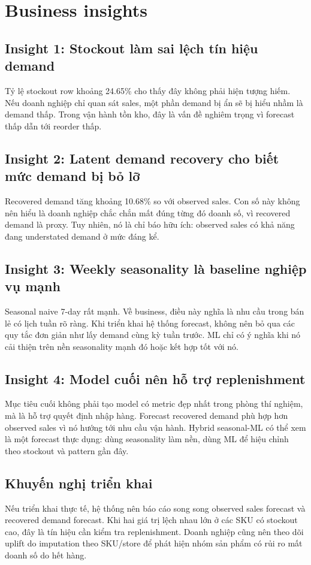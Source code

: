 \section{Business insights}

\subsection{Insight 1: Stockout làm sai lệch tín hiệu demand}

Tỷ lệ stockout row khoảng 24.65\% cho thấy đây không phải hiện tượng hiếm. Nếu doanh nghiệp chỉ quan sát sales, một phần demand bị ẩn sẽ bị hiểu nhầm là demand thấp. Trong vận hành tồn kho, đây là vấn đề nghiêm trọng vì forecast thấp dẫn tới reorder thấp.

\subsection{Insight 2: Latent demand recovery cho biết mức demand bị bỏ lỡ}

Recovered demand tăng khoảng 10.68\% so với observed sales. Con số này không nên hiểu là doanh nghiệp chắc chắn mất đúng từng đó doanh số, vì recovered demand là proxy. Tuy nhiên, nó là chỉ báo hữu ích: observed sales có khả năng đang understated demand ở mức đáng kể.

\subsection{Insight 3: Weekly seasonality là baseline nghiệp vụ mạnh}

Seasonal naive 7-day rất mạnh. Về business, điều này nghĩa là nhu cầu trong bán lẻ có lịch tuần rõ ràng. Khi triển khai hệ thống forecast, không nên bỏ qua các quy tắc đơn giản như lấy demand cùng kỳ tuần trước. ML chỉ có ý nghĩa khi nó cải thiện trên nền seasonality mạnh đó hoặc kết hợp tốt với nó.

\subsection{Insight 4: Model cuối nên hỗ trợ replenishment}

Mục tiêu cuối không phải tạo model có metric đẹp nhất trong phòng thí nghiệm, mà là hỗ trợ quyết định nhập hàng. Forecast recovered demand phù hợp hơn observed sales vì nó hướng tới nhu cầu vận hành. Hybrid seasonal-ML có thể xem là một forecast thực dụng: dùng seasonality làm nền, dùng ML để hiệu chỉnh theo stockout và pattern gần đây.

\subsection{Khuyến nghị triển khai}

Nếu triển khai thực tế, hệ thống nên báo cáo song song observed sales forecast và recovered demand forecast. Khi hai giá trị lệch nhau lớn ở các SKU có stockout cao, đây là tín hiệu cần kiểm tra replenishment. Doanh nghiệp cũng nên theo dõi uplift do imputation theo SKU/store để phát hiện nhóm sản phẩm có rủi ro mất doanh số do hết hàng.
